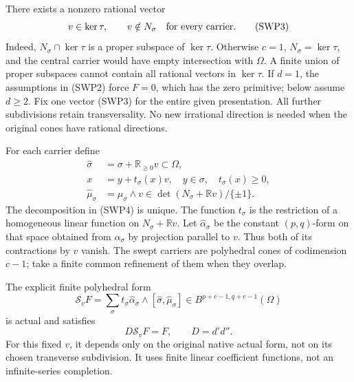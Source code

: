 There exists a nonzero rational vector
\[
       v\in\ker\tau,\qquad v\notin N_\sigma
                              \quad\hbox{for every carrier.}
 \tag{SWP3}
\]
Indeed, $N_\sigma\cap\ker\tau$ is a proper subspace of
$\ker\tau$.  Otherwise $c=1$, $N_\sigma=\ker\tau$,
and the central carrier would have empty intersection with $\Omega$.
A finite union of proper subspaces cannot contain all rational
vectors in $\ker\tau$.  If $d=1$, the assumptions in (SWP2)
force $F=0$, which has the zero primitive; below assume $d\ge2$.
Fix one vector (SWP3) for the entire given presentation.  All further
subdivisions retain transversality.  No new irrational direction is
needed when the original cones have rational directions.

For each carrier define
\[
 \begin{split}
 \widehat\sigma&=\sigma+\mathbb R_{\ge0}v\subset\Omega,\\
 x&=y+t_\sigma(x)v,
       \quad y\in\sigma,\quad t_\sigma(x)\ge0,\\
 \widehat\mu_\sigma&=\mu_\sigma\wedge v
                     \in\det(N_\sigma+\mathbb Rv)/\{\pm1\}.
 \end{split}
 \tag{SWP4}
\]
The decomposition in (SWP4) is unique.  The function $t_\sigma$
is the restriction of a homogeneous linear function on
$N_\sigma+\mathbb Rv$.  Let $\widehat\alpha_\sigma$ be the
constant $(p,q)$-form on that space obtained from
$\alpha_\sigma$ by projection parallel to $v$.  Thus both of
its contractions by $v$ vanish.  The swept carriers are polyhedral
cones of codimension $c-1$; take a finite common refinement of them
when they overlap.

\begin{theorem}
The explicit finite polyhedral form
\[
 \boxed{\quad
 \mathcal S_v F=\sum_\sigma
       t_\sigma\widehat\alpha_\sigma
                         \wedge[\widehat\sigma,\widehat\mu_\sigma]
       \in B^{p+c-1,q+c-1}(\Omega)
 \quad}
 \tag{SWP5}
\]
is actual and satisfies
\[
                         D\mathcal S_vF=F,
                         \qquad D=d'd''.
 \tag{SWP6}
\]
For this fixed $v$, it depends only on the original native actual
form, not on its chosen transverse subdivision.  It uses finite
linear coefficient functions, not an infinite-series completion.
\end{theorem}

